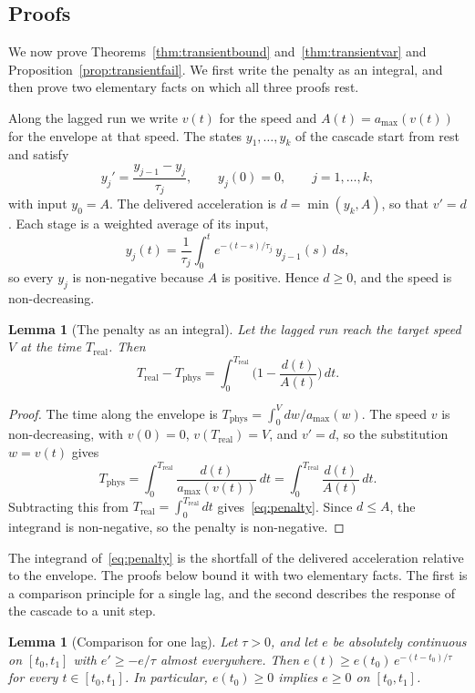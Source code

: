 \documentclass[12pt, twoside]{amsart}
\newtheorem{lemma}[theorem]{Lemma}
\theoremstyle{definition}
\newcommand{\amax}{a_{\max}}
\begin{document}
\subsection{Proofs}

We now prove Theorems~\ref{thm:transientbound} and~\ref{thm:transientvar} and
Proposition~\ref{prop:transientfail}. We first write the penalty as an integral,
and then prove two elementary facts on which all three proofs rest.

Along the lagged run we write $v(t)$ for the speed and $A(t)=\amax(v(t))$ for the envelope at that
speed. The states $y_1,\dots,y_k$ of the cascade start from rest and satisfy
\[
y_j'=\frac{y_{j-1}-y_j}{\tau_j},\qquad y_j(0)=0,\qquad j=1,\dots,k,
\]
with input $y_0=A$. The delivered acceleration is $d=\min(y_k,A)$, so that $v'=d$. Each stage is a
weighted average of its input,
\[
y_j(t)=\frac1{\tau_j}\int_0^te^{-(t-s)/\tau_j}\,y_{j-1}(s)\,ds,
\]
so every $y_j$ is non-negative because $A$ is positive. Hence $d\ge0$, and the speed is
non-decreasing.

\begin{lemma}[The penalty as an integral]\label{lem:penalty}
Let the lagged run reach the target speed $V$ at the time $T_{\mathrm{real}}$. Then
\begin{equation}\label{eq:penalty}
T_{\mathrm{real}}-T_{\mathrm{phys}}=\int_0^{T_{\mathrm{real}}}\Big(1-\frac{d(t)}{A(t)}\Big)\,dt .
\end{equation}
\end{lemma}

\begin{proof}
The time along the envelope is $T_{\mathrm{phys}}=\int_0^Vdw/\amax(w)$. The speed $v$ is
non-decreasing, with $v(0)=0$, $v(T_{\mathrm{real}})=V$, and $v'=d$, so the substitution $w=v(t)$ gives
\[
T_{\mathrm{phys}}=\int_0^{T_{\mathrm{real}}}\frac{d(t)}{\amax(v(t))}\,dt=\int_0^{T_{\mathrm{real}}}\frac{d(t)}{A(t)}\,dt .
\]
Subtracting this from $T_{\mathrm{real}}=\int_0^{T_{\mathrm{real}}}dt$ gives~\eqref{eq:penalty}.
Since $d\le A$, the integrand is non-negative, so the penalty is non-negative.
\end{proof}

The integrand of~\eqref{eq:penalty} is the shortfall of the delivered acceleration relative to the
envelope. The proofs below bound it with two elementary facts. The first is a comparison principle
for a single lag, and the second describes the response of the cascade to a unit step.

\begin{lemma}[Comparison for one lag]\label{lem:gronwall}
Let $\tau>0$, and let $e$ be absolutely continuous on $[t_0,t_1]$ with $e'\ge-e/\tau$ almost
everywhere. Then $e(t)\ge e(t_0)\,e^{-(t-t_0)/\tau}$ for every $t\in[t_0,t_1]$. In particular,
$e(t_0)\ge0$ implies $e\ge0$ on $[t_0,t_1]$.
\end{lemma}
\end{document}
